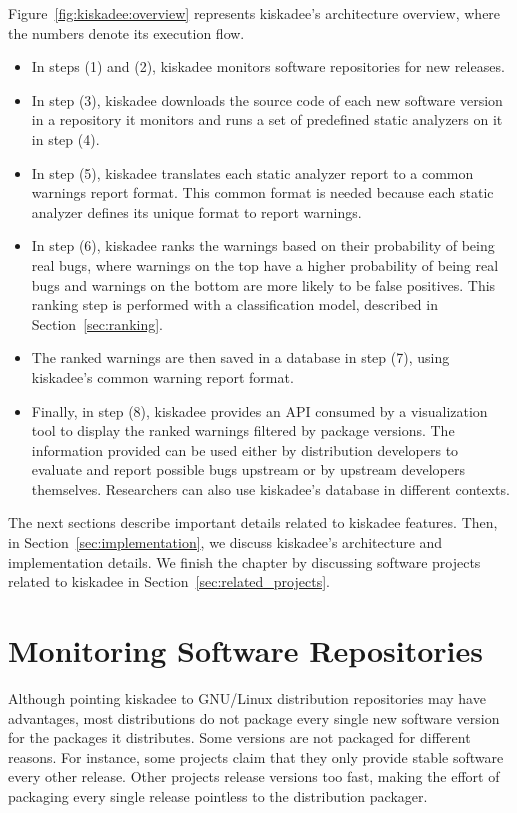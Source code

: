 Figure~\ref{fig:kiskadee:overview} represents kiskadee's architecture overview,
where the numbers denote its execution flow.
\begin{itemize}
  \item In steps (1) and (2), kiskadee
monitors software repositories for new releases.
    \item In step (3), kiskadee
downloads the source code of each new software version in a repository it
monitors and runs a set of predefined static analyzers on it in step (4).
    \item In step (5),
kiskadee translates each static analyzer report to a common warnings report format.
This common format is needed because each static analyzer defines
its unique format to report warnings.
    \item In step (6), kiskadee ranks the warnings
based on their probability of being real bugs, where warnings on the top have a
higher probability of being real bugs and warnings on the bottom are more
likely to be false positives. This ranking step is performed with a
classification model, described in Section~\ref{sec:ranking}.
    \item The ranked
warnings are then saved in a database in step (7), using kiskadee's common
warning report format.  
    \item Finally, in step (8), kiskadee provides an API consumed
by a visualization tool to display the ranked warnings filtered by package
versions. The information provided can be used either by distribution developers to
evaluate and report possible bugs upstream or by upstream developers
themselves. Researchers can also use kiskadee's database in different contexts.
\end{itemize}

The next sections describe important details related to
kiskadee features. Then, in Section~\ref{sec:implementation}, we discuss
kiskadee's architecture and implementation details. We finish the chapter by discussing software projects related to kiskadee in Section~\ref{sec:related_projects}.

\section{Monitoring Software Repositories}
\label{sec:monitoring}

Although pointing kiskadee to GNU/Linux distribution repositories may have
advantages, most distributions do not package every single new software version
for the packages it distributes. Some versions are not packaged for different
reasons. For instance, some projects claim that they only provide stable
software every other release. Other projects release versions too fast, making
the effort of packaging every single release pointless to the distribution
packager.


